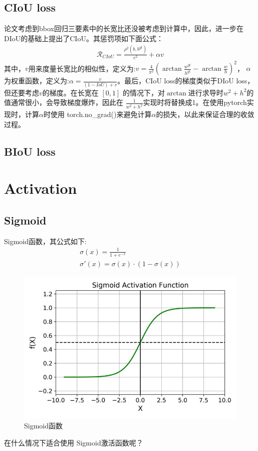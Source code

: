 \documentclass{article}
\begin{document}
\subsection{CIoU loss}
论文考虑到bbox回归三要素中的长宽比还没被考虑到计算中，因此，进一步在DIoU的基础上提出了CIoU。其惩罚项如下面公式：
\begin{align}
\mathcal{R}_{CIoU} = \frac{\rho^2(b,b^{gt})}{c^2} + \alpha v
\end{align}
其中，$v$用来度量长宽比的相似性，定义为:$v=\frac{4}{\pi^2}(\arctan{\frac{w^{gt}}{h^{gt}}}- \arctan{\frac{w}{h}})^2 $， $\alpha$为权重函数，定义为:$\alpha = \frac{v}{(1-IoU)+v}$。最后，CIoU loss的梯度类似于DIoU loss，但还要考虑$v$的梯度。在长宽在 $[0,1]$ 的情况下，对$\arctan$进行求导时$w^2+h^2$的值通常很小，会导致梯度爆炸，因此在 $\frac{1}{w^2+h^2}$实现时将替换成1。在使用pytorch实现时，计算$\alpha$时使用 torch.no\_grad()来避免计算$\alpha$的损失，以此来保证合理的收敛过程。

\subsection{BIoU loss}

\section{Activation}
\subsection{Sigmoid}
Sigmoid函数，其公式如下:
\begin{align}
\sigma(x) = \frac{1}{1+e^{-x}} \\
\sigma'(x) = \sigma(x) \cdot (1 - \sigma(x))
\end{align}
\begin{figure}[htp]
\centering
\includegraphics[scale=0.3]{images/activation/sigmoid.jpg}
\caption{Sigmoid函数}
\label{Fig.sigmoid}
\end{figure}
在什么情况下适合使用 Sigmoid激活函数呢？
\end{document}
